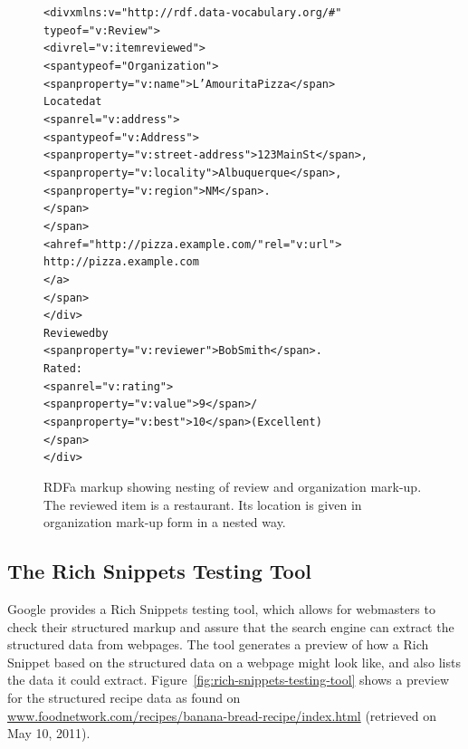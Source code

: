 \documentclass[12pt]{article}
\newenvironment{code}[1]
{\begin{lrbox}{\inverbatim}\begin{minipage}{13.5cm}\begin{alltt}{#1}}
{\end{alltt}\end{minipage}\end{lrbox}\colorbox{lightgray}{\usebox{\inverbatim}}}
\begin{document}
\begin{figure}[htbp!]
\begin{center}
{\footnotesize
\begin{code}
<div xmlns:v="http://rdf.data-vocabulary.org/#"
     typeof="v:Review">
  <div rel="v:itemreviewed">
    <span typeof="Organization">   
      <span property="v:name">L'Amourita Pizza</span>
      Located at 
      <span rel="v:address">
        <span typeof="v:Address">
          <span property="v:street-address">123 Main St</span>, 
          <span property="v:locality">Albuquerque</span>, 
          <span property="v:region">NM</span>.
        </span>
      </span>
      <a href="http://pizza.example.com/" rel="v:url">
        http://pizza.example.com
      </a>
    </span>
  </div>
  Reviewed by 
  <span property="v:reviewer">Bob Smith</span>. 
  Rated: 
  <span rel="v:rating">
    <span property="v:value">9</span>/
    <span property="v:best">10</span> (Excellent)
  </span>
</div> 
\end{code}}
  \caption[RDFa markup showing nesting of review and organization mark-up.]{RDFa markup showing nesting of review and organization mark-up. The reviewed item is a restaurant. Its location is given in organization mark-up form in a nested way.}
  \label{code:rich-snippet-nested}
  \end{center}  
\end{figure}

\subsection{The Rich Snippets Testing Tool}
Google provides a Rich Snippets testing tool, which allows for webmasters to check their structured markup and assure that the search engine can extract the structured data from webpages. The tool generates a preview of how a Rich Snippet based on the structured data on a webpage might look like, and also lists the data it could extract. Figure~\ref{fig:rich-snippets-testing-tool} shows a preview for the structured recipe data as found on \url{www.foodnetwork.com/recipes/banana-bread-recipe/index.html} (retrieved on May 10, 2011).
\end{document}
